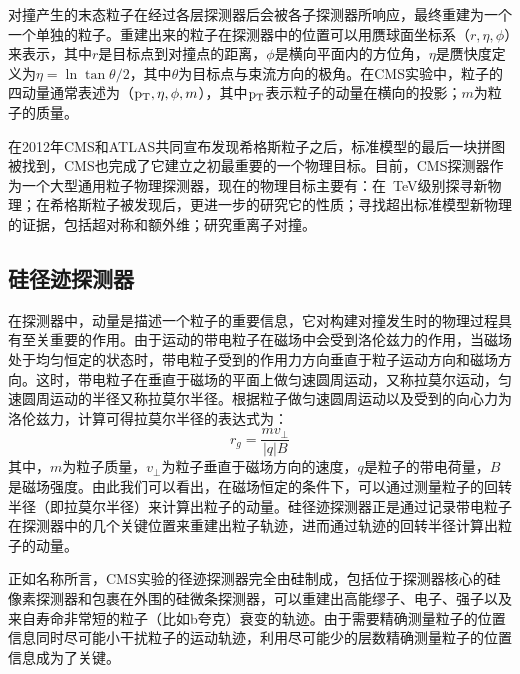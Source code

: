 对撞产生的末态粒子在经过各层探测器后会被各子探测器所响应，最终重建为一个一个单独的粒子。重建出来的粒子在探测器中的位置可以用赝球面坐标系（$r,\eta,\phi$）来表示，其中$r$是目标点到对撞点的距离，$\phi$是横向平面内的方位角，$\eta$是赝快度定义为$\eta = \ln{\tan{\theta/2}}$，其中$\theta$为目标点与束流方向的极角。在CMS实验中，粒子的四动量通常表述为（$\mathrm{p_{T}},\eta,\phi,m$），其中$\mathrm{p_{T}}$表示粒子的动量在横向的投影；$m$为粒子的质量。

在2012年CMS和ATLAS共同宣布发现希格斯粒子之后，标准模型的最后一块拼图被找到，CMS也完成了它建立之初最重要的一个物理目标。目前，CMS探测器作为一个大型通用粒子物理探测器，现在的物理目标主要有：在~\si{\TeV}级别探寻新物理；在希格斯粒子被发现后，更进一步的研究它的性质；寻找超出标准模型新物理的证据，包括超对称和额外维；研究重离子对撞。

\subsection{硅径迹探测器}

在探测器中，动量是描述一个粒子的重要信息，它对构建对撞发生时的物理过程具有至关重要的作用。由于运动的带电粒子在磁场中会受到洛伦兹力的作用，当磁场处于均匀恒定的状态时，带电粒子受到的作用力方向垂直于粒子运动方向和磁场方向。这时，带电粒子在垂直于磁场的平面上做匀速圆周运动，又称拉莫尔运动，匀速圆周运动的半径又称拉莫尔半径。根据粒子做匀速圆周运动以及受到的向心力为洛伦兹力，计算可得拉莫尔半径的表达式为：
\begin{equation}\label{eq:2-1}
    r_{g}=\frac{m v_{\perp}}{|q| B}
\end{equation}
其中，$m$为粒子质量，$v_{\perp}$为粒子垂直于磁场方向的速度，$q$是粒子的带电荷量，$B$是磁场强度。由此我们可以看出，在磁场恒定的条件下，可以通过测量粒子的回转半径（即拉莫尔半径）来计算出粒子的动量。硅径迹探测器正是通过记录带电粒子在探测器中的几个关键位置来重建出粒子轨迹，进而通过轨迹的回转半径计算出粒子的动量。

正如名称所言，CMS实验的径迹探测器完全由硅制成，包括位于探测器核心的硅像素探测器和包裹在外围的硅微条探测器，可以重建出高能缪子、电子、强子以及来自寿命非常短的粒子（比如b夸克）衰变的轨迹。由于需要精确测量粒子的位置信息同时尽可能小干扰粒子的运动轨迹，利用尽可能少的层数精确测量粒子的位置信息成为了关键。

